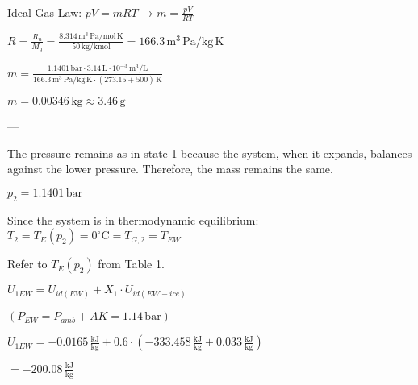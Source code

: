 Ideal Gas Law:  
\( pV = mRT \) → \( m = \frac{pV}{RT} \)  

\( R = \frac{R_u}{M_g} = \frac{8.314 \, \text{m}^3 \, \text{Pa}/\text{mol} \, \text{K}}{50 \, \text{kg}/\text{kmol}} = 166.3 \, \text{m}^3 \, \text{Pa}/\text{kg} \, \text{K} \)  

\( m = \frac{1.1401 \, \text{bar} \cdot 3.14 \, \text{L} \cdot 10^{-3} \, \text{m}^3/\text{L}}{166.3 \, \text{m}^3 \, \text{Pa}/\text{kg} \, \text{K} \cdot (273.15 + 500) \, \text{K}} \)  

\( m = 0.00346 \, \text{kg} \approx 3.46 \, \text{g} \)  

---

The pressure remains as in state 1 because the system, when it expands, balances against the lower pressure. Therefore, the mass remains the same.  

\( p_2 = 1.1401 \, \text{bar} \)  

Since the system is in thermodynamic equilibrium:  
\( T_2 = T_E(p_2) = 0^\circ \text{C} = T_{G,2} = T_{EW} \)  

Refer to \( T_E(p_2) \) from Table 1.

\( U_{1EW} = U_{id(EW)} + X_1 \cdot U_{id(EW-ice)} \)  

\( (P_{EW} = P_{amb} + AK = 1.14 \, \text{bar}) \)  

\( U_{1EW} = -0.0165 \, \frac{\text{kJ}}{\text{kg}} + 0.6 \cdot (-333.458 \, \frac{\text{kJ}}{\text{kg}} + 0.033 \, \frac{\text{kJ}}{\text{kg}}) \)  

\( = -200.08 \, \frac{\text{kJ}}{\text{kg}} \)
